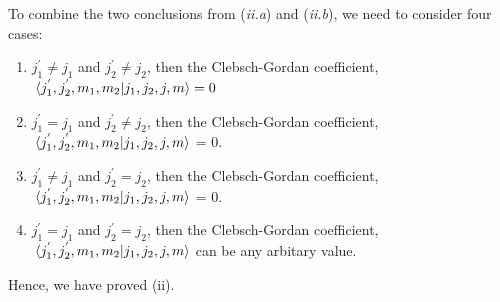 \documentclass{article}
\begin{document}
To combine the two conclusions from (\textit{ii.a}) and (\textit{ii.b}), we need to consider four cases:
\begin{enumerate}
  \item $j_1^{'} \neq j_1$ and $j_2^{'} \neq j_2$, then the Clebsch-Gordan coefficient, $\bra*{j_1^{'}, j_2^{'}, m_1, m_2} \ket{j_1, j_2, j, m} = 0$
  \item $j_1^{'} = j_1$ and $j_2^{'} \neq j_2$, then the Clebsch-Gordan coefficient, $\bra*{j_1^{'}, j_2^{'}, m_1, m_2} \ket{j_1, j_2, j, m}$ = 0.
  \item $j_1^{'} \neq j_1$ and $j_2^{'} = j_2$, then the Clebsch-Gordan coefficient, $\bra*{j_1^{'}, j_2^{'}, m_1, m_2} \ket{j_1, j_2, j, m}$ = 0.
  \item $j_1^{'} = j_1$ and $j_2^{'} = j_2$, then the Clebsch-Gordan coefficient, $\bra*{j_1^{'}, j_2^{'}, m_1, m_2} \ket{j_1, j_2, j, m}$ can be any arbitary value.
\end{enumerate}

Hence, we have proved (ii).
\end{document}

